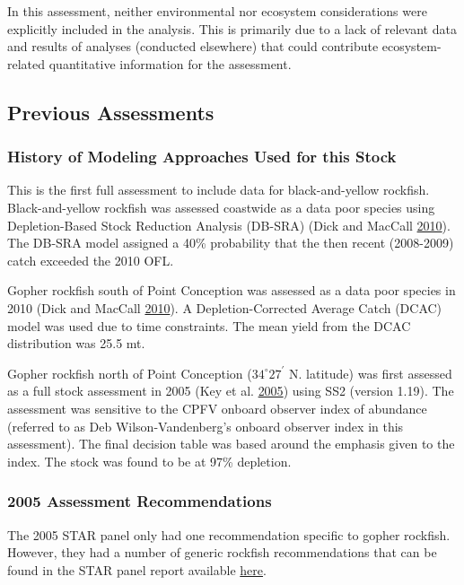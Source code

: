\documentclass[12pt,]{article}
\begin{document}
In this assessment, neither environmental nor ecosystem considerations
were explicitly included in the analysis. This is primarily due to a
lack of relevant data and results of analyses (conducted elsewhere) that
could contribute ecosystem-related quantitative information for the
assessment.

\subsection{Previous Assessments}\label{previous-assessments}

\subsubsection{History of Modeling Approaches Used for this
Stock}\label{history-of-modeling-approaches-used-for-this-stock}

This is the first full assessment to include data for black-and-yellow
rockfish. Black-and-yellow rockfish was assessed coastwide as a data
poor species using Depletion-Based Stock Reduction Analysis (DB-SRA)
(Dick and MacCall \protect\hyperlink{ref-Dick2010}{2010}). The DB-SRA
model assigned a 40\% probability that the then recent (2008-2009) catch
exceeded the 2010 OFL.

Gopher rockfish south of Point Conception was assessed as a data poor
species in 2010 (Dick and MacCall
\protect\hyperlink{ref-Dick2010}{2010}). A Depletion-Corrected Average
Catch (DCAC) model was used due to time constraints. The mean yield from
the DCAC distribution was 25.5 mt.

Gopher rockfish north of Point Conception (\(34^\circ 27^\prime\) N.
latitude) was first assessed as a full stock assessment in 2005 (Key et
al. \protect\hyperlink{ref-Key2005}{2005}) using SS2 (version 1.19). The
assessment was sensitive to the CPFV onboard observer index of abundance
(referred to as Deb Wilson-Vandenberg's onboard observer index in this
assessment). The final decision table was based around the emphasis
given to the index. The stock was found to be at 97\% depletion.

\subsubsection{2005 Assessment
Recommendations}\label{assessment-recommendations}

The 2005 STAR panel only had one recommendation specific to gopher
rockfish. However, they had a number of generic rockfish recommendations
that can be found in the STAR panel report available
\href{https://www.pcouncil.org/groundfish/stock-assessments/by-species/gopher-rockfish/}{here}.
\end{document}
